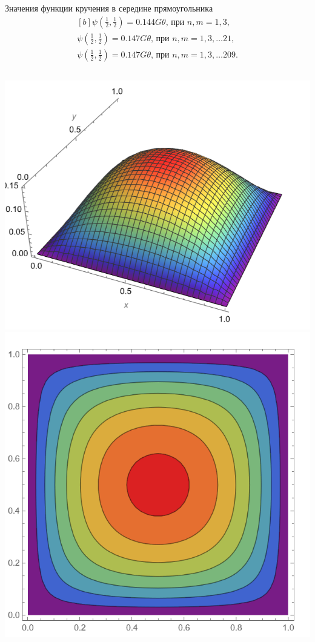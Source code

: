 \documentclass[ignoreonframetext,unicode]{beamer}
\begin{document}
\begin{frame}{}
	\begin{block}{Значения функции кручения в середине прямоугольника}	
	\[
		\begin{aligned}[b]
		\psi\left(\frac{1}{2}, \frac{1}{2}\right) = 0.144G\theta\mbox{, при } n, m = 1, 3, \\
		\psi\left(\frac{1}{2}, \frac{1}{2}\right) = 0.147G\theta\mbox{, при } n, m = 1, 3, \ldots21,\\
		\psi\left(\frac{1}{2}, \frac{1}{2}\right) = 0.147G\theta\mbox{, при } n, m = 1, 3, \ldots209.
	\end{aligned}
	\]
	\end{block}

	\begin{columns}
	\includegraphics[width=\textwidth]{ser_graph}%
	\includegraphics[width=\textwidth]{ser_levels}%
\end{columns}
\end{frame}
\end{document}
